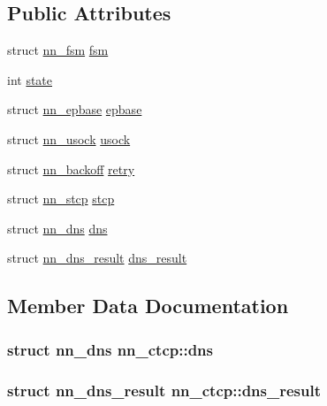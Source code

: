 \subsection*{Public Attributes}
\begin{DoxyCompactItemize}
\item 
struct \hyperlink{structnn__fsm}{nn\+\_\+fsm} \hyperlink{structnn__ctcp_a718324121d9a84e33bf2d7dbd1f6a8d8}{fsm}
\item 
int \hyperlink{structnn__ctcp_a4f07e9462114b70bbcac159837dd08b9}{state}
\item 
struct \hyperlink{structnn__epbase}{nn\+\_\+epbase} \hyperlink{structnn__ctcp_ab2ac5f22ebfcd925d3d9d3ecd89ec4bf}{epbase}
\item 
struct \hyperlink{structnn__usock}{nn\+\_\+usock} \hyperlink{structnn__ctcp_a4e614d0b4252d851f49c999b67d3fdc0}{usock}
\item 
struct \hyperlink{structnn__backoff}{nn\+\_\+backoff} \hyperlink{structnn__ctcp_ac1b95bd51dafc4cd2cdd710759f5767b}{retry}
\item 
struct \hyperlink{structnn__stcp}{nn\+\_\+stcp} \hyperlink{structnn__ctcp_ad3b1a0f3182b0ea30097b77d182c769e}{stcp}
\item 
struct \hyperlink{structnn__dns}{nn\+\_\+dns} \hyperlink{structnn__ctcp_a74fd788c14b71695640c6472e2c9d122}{dns}
\item 
struct \hyperlink{structnn__dns__result}{nn\+\_\+dns\+\_\+result} \hyperlink{structnn__ctcp_a8020854c49bc9f9ce455793400d8fdde}{dns\+\_\+result}
\end{DoxyCompactItemize}


\subsection{Member Data Documentation}
\subsubsection[{dns}]{\setlength{\rightskip}{0pt plus 5cm}struct {\bf nn\+\_\+dns} nn\+\_\+ctcp\+::dns}\hypertarget{structnn__ctcp_a74fd788c14b71695640c6472e2c9d122}{}\label{structnn__ctcp_a74fd788c14b71695640c6472e2c9d122}
\subsubsection[{dns\+\_\+result}]{\setlength{\rightskip}{0pt plus 5cm}struct {\bf nn\+\_\+dns\+\_\+result} nn\+\_\+ctcp\+::dns\+\_\+result}\hypertarget{structnn__ctcp_a8020854c49bc9f9ce455793400d8fdde}{}\label{structnn__ctcp_a8020854c49bc9f9ce455793400d8fdde}
